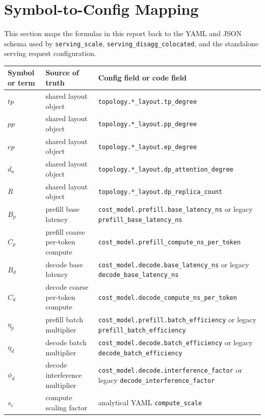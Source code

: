 \section{Symbol-to-Config Mapping}

This section maps the formulas in this report back to the YAML and JSON schema
used by \texttt{serving\_scale}, \texttt{serving\_disagg\_colocated}, and the
standalone serving request configuration.

\renewcommand{\arraystretch}{1.2}

\begin{longtable}{p{} p{} p{}}
\toprule
Symbol or term & Source of truth & Config field or code field \\
\midrule
\endhead
\(tp\) & shared layout object & \texttt{topology.*\_layout.tp\_degree} \\
\(pp\) & shared layout object & \texttt{topology.*\_layout.pp\_degree} \\
\(ep\) & shared layout object & \texttt{topology.*\_layout.ep\_degree} \\
\(d_a\) & shared layout object & \texttt{topology.*\_layout.dp\_attention\_degree} \\
\(R\) & shared layout object & \texttt{topology.*\_layout.dp\_replica\_count} \\
\(B_p\) & prefill base latency & \texttt{cost\_model.prefill.base\_latency\_ns} or legacy \texttt{prefill\_base\_latency\_ns} \\
\(C_p\) & prefill coarse per-token compute & \texttt{cost\_model.prefill\_compute\_ns\_per\_token} \\
\(B_d\) & decode base latency & \texttt{cost\_model.decode.base\_latency\_ns} or legacy \texttt{decode\_base\_latency\_ns} \\
\(C_d\) & decode coarse per-token compute & \texttt{cost\_model.decode\_compute\_ns\_per\_token} \\
\(\eta_p\) & prefill batch multiplier & \texttt{cost\_model.prefill.batch\_efficiency} or legacy \texttt{prefill\_batch\_efficiency} \\
\(\eta_d\) & decode batch multiplier & \texttt{cost\_model.decode.batch\_efficiency} or legacy \texttt{decode\_batch\_efficiency} \\
\(\phi_d\) & decode interference multiplier & \texttt{cost\_model.decode.interference\_factor} or legacy \texttt{decode\_interference\_factor} \\
\(s_c\) & compute scaling factor & analytical YAML \texttt{compute\_scale} \\

\end{longtable}
